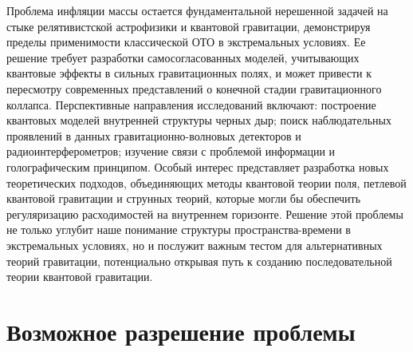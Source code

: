 Проблема инфляции массы остается фундаментальной нерешенной задачей на стыке релятивистской астрофизики и квантовой гравитации, демонстрируя пределы применимости классической ОТО в экстремальных условиях. Ее решение требует разработки самосогласованных моделей, учитывающих квантовые эффекты в сильных гравитационных полях, и может привести к пересмотру современных представлений о конечной стадии гравитационного коллапса. Перспективные направления исследований включают: построение квантовых моделей внутренней структуры черных дыр; поиск наблюдательных проявлений в данных гравитационно-волновых детекторов и радиоинтерферометров; изучение связи с проблемой информации и голографическим принципом. Особый интерес представляет разработка новых теоретических подходов, объединяющих методы квантовой теории поля, петлевой квантовой гравитации и струнных теорий, которые могли бы обеспечить регуляризацию расходимостей на внутреннем горизонте. Решение этой проблемы не только углубит наше понимание структуры пространства-времени в экстремальных условиях, но и послужит важным тестом для альтернативных теорий гравитации, потенциально открывая путь к созданию последовательной теории квантовой гравитации.

\section{Возможное разрешение проблемы}\label{sec:3.2}

